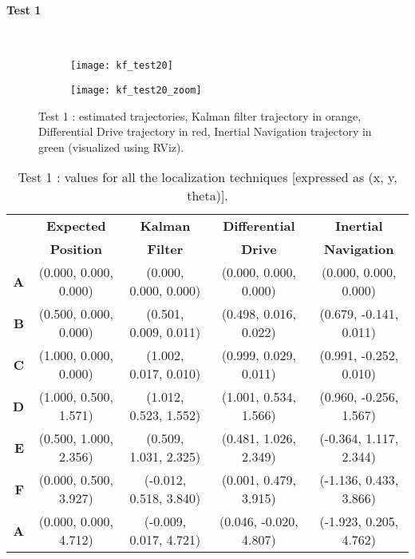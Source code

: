 \paragraph{Test 1}\mbox{}\\
\begin{figure}[!ht]
	\begin{subfigure}{0.35\textwidth}
		\texttt{[image: kf\_test20]}
	\end{subfigure}\hfil
	\begin{subfigure}{0.55\textwidth}
		\texttt{[image: kf\_test20\_zoom]}
	\end{subfigure}
	\captionsetup{justification=centering, margin=1.5cm}
	\centering
	\caption{Test 1 : estimated trajectories, Kalman filter trajectory in orange, Differential Drive trajectory in red, Inertial Navigation trajectory in green (visualized using RViz).}
	\centering
\end{figure}
\begin{table}[ht!]
	\centering
	\hspace*{-1cm}
	\begin{tabular}{rcccc}
		\toprule
		& \textbf{Expected} & \textbf{Kalman} & \textbf{Differential} & \textbf{Inertial}\\
		& \textbf{Position} & \textbf{Filter} & \textbf{Drive} & \textbf{Navigation}\\
		\midrule
		\textbf{A} & (0.000, 0.000, 0.000) & (0.000, 0.000, 0.000) & (0.000, 0.000, 0.000) & (0.000, 0.000, 0.000)\\
		\textbf{B} & (0.500, 0.000, 0.000) & (0.501, 0.009, 0.011) & (0.498, 0.016, 0.022) & (0.679, -0.141, 0.011)\\
		\textbf{C} & (1.000, 0.000, 0.000) & (1.002, 0.017, 0.010) & (0.999, 0.029, 0.011) & (0.991, -0.252, 0.010)\\
		\textbf{D} & (1.000, 0.500, 1.571) & (1.012, 0.523, 1.552) & (1.001, 0.534, 1.566) & (0.960, -0.256, 1.567)\\
		\textbf{E} & (0.500, 1.000, 2.356) & (0.509, 1.031, 2.325) & (0.481, 1.026, 2.349) & (-0.364, 1.117, 2.344)\\
		\textbf{F} & (0.000, 0.500, 3.927) & (-0.012, 0.518, 3.840) & (0.001, 0.479, 3.915) & (-1.136, 0.433, 3.866)\\
		\textbf{A} & (0.000, 0.000, 4.712) & (-0.009, 0.017, 4.721) & (0.046, -0.020, 4.807) & (-1.923, 0.205, 4.762)\\
		\bottomrule
	\end{tabular}
	\hspace*{-1cm}
	\caption{Test 1 : values for all the localization techniques [expressed as (x, y, theta)].}
\end{table}

